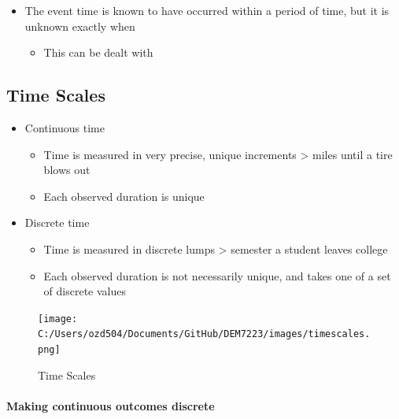 \documentclass[
]{article}
\providecommand{\tightlist}{%
  \setlength{\itemsep}{0pt}\setlength{\parskip}{0pt}}
\begin{document}
\begin{itemize}
\tightlist
\item
  The event time is known to have occurred within a period of time, but it is unknown exactly when

  \begin{itemize}
  \tightlist
  \item
    This can be dealt with
  \end{itemize}
\end{itemize}

\hypertarget{time-scales}{%
\subsection{Time Scales}\label{time-scales}}

\begin{itemize}
\tightlist
\item
  Continuous time

  \begin{itemize}
  \tightlist
  \item
    Time is measured in very precise, unique increments \textgreater{} miles until a tire blows out
  \item
    Each observed duration is unique
  \end{itemize}
\item
  Discrete time

  \begin{itemize}
  \tightlist
  \item
    Time is measured in discrete lumps \textgreater{} semester a student leaves college
  \item
    Each observed duration is not necessarily unique, and takes one of a set of discrete values
  \end{itemize}
\end{itemize}

\begin{figure}
\centering
\texttt{[image: C:/Users/ozd504/Documents/GitHub/DEM7223/images/timescales.png]}
\caption{Time Scales}
\end{figure}

\hypertarget{making-continuous-outcomes-discrete}{%
\paragraph{Making continuous outcomes discrete}\label{making-continuous-outcomes-discrete}}
\end{document}
